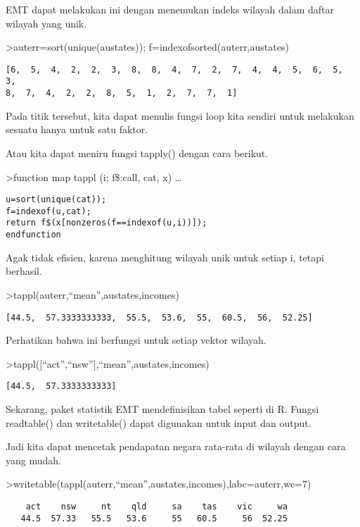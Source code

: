 \documentclass[
]{book}
\begin{document}
EMT dapat melakukan ini dengan menemukan indeks wilayah dalam daftar wilayah yang unik.

\textgreater auterr=sort(unique(austates)); f=indexofsorted(auterr,austates)

\begin{verbatim}
[6,  5,  4,  2,  2,  3,  8,  8,  4,  7,  2,  7,  4,  4,  5,  6,  5,  3,
8,  7,  4,  2,  2,  8,  5,  1,  2,  7,  7,  1]
\end{verbatim}

Pada titik tersebut, kita dapat menulis fungsi loop kita sendiri untuk melakukan sesuatu hanya untuk satu faktor.

Atau kita dapat meniru fungsi tapply() dengan cara berikut.

\textgreater function map tappl (i; f\$:call, cat, x) \ldots{}

\begin{verbatim}
u=sort(unique(cat));
f=indexof(u,cat);
return f$(x[nonzeros(f==indexof(u,i))]);
endfunction
\end{verbatim}

Agak tidak efisien, karena menghitung wilayah unik untuk setiap i, tetapi berhasil.

\textgreater tappl(auterr,``mean'',austates,incomes)

\begin{verbatim}
[44.5,  57.3333333333,  55.5,  53.6,  55,  60.5,  56,  52.25]
\end{verbatim}

Perhatikan bahwa ini berfungsi untuk setiap vektor wilayah.

\textgreater tappl({[}``act'',``nsw''{]},``mean'',austates,incomes)

\begin{verbatim}
[44.5,  57.3333333333]
\end{verbatim}

Sekarang, paket statistik EMT mendefinisikan tabel seperti di R. Fungsi readtable() dan writetable() dapat digunakan untuk input dan output.

Jadi kita dapat mencetak pendapatan negara rata-rata di wilayah dengan cara yang mudah.

\textgreater writetable(tappl(auterr,``mean'',austates,incomes),labc=auterr,wc=7)

\begin{verbatim}
    act    nsw     nt    qld     sa    tas    vic     wa
   44.5  57.33   55.5   53.6     55   60.5     56  52.25
\end{verbatim}
\end{document}
